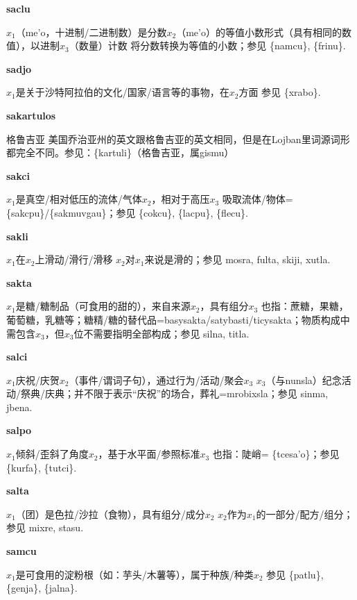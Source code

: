 \documentclass[notitlepage,twocolumn,a4paper,10pt]{book}
\begin{document}
{\sffamily\bfseries saclu} $x_1$（me'o，十进制\slash{}二进制数）是分数$x_2$（me'o）的等值小数形式（具有相同的数值），以进制$x_3$（数量）计数 \textemdash{} 将分数转换为等值的小数；参见 \{namcu\}, \{frinu\}.

{\sffamily\bfseries sadjo}\enspace {\ttfamily\bfseries[    djo]}  $x_1$是关于沙特阿拉伯的文化\slash{}国家\slash{}语言等的事物，在$x_2$方面 \textemdash{} 参见 \{xrabo\}.

{\sffamily\bfseries sakartulos} 格鲁吉亚 \textemdash{} 美国乔治亚州的英文跟格鲁吉亚的英文相同，但是在Lojban里词源词形都完全不同。参见：\{kartuli\}（格鲁吉亚，属gismu）

{\sffamily\bfseries sakci}\enspace {\ttfamily\bfseries[sak]}  $x_1$是真空\slash{}相对低压的流体\slash{}气体$x_2$，相对于高压$x_3$ \textemdash{} 吸取流体\slash{}物体= \{sakcpu\}\slash{}\{sakmuvgau\}；参见 \{cokcu\}, \{lacpu\}, \{flecu\}.

{\sffamily\bfseries sakli}\enspace {\ttfamily\bfseries[sal]}  $x_1$在$x_2$上滑动\slash{}滑行\slash{}滑移 \textemdash{} $x_2$对$x_1$来说是滑的；参见 {mosra}, {fulta}, {skiji}, {xutla}.

{\sffamily\bfseries sakta}\enspace {\ttfamily\bfseries[sat]}  $x_1$是糖\slash{}糖制品（可食用的甜的），来自来源$x_2$，具有组分$x_3$ \textemdash{} 也指：蔗糖，果糖，葡萄糖，乳糖等；糖精\slash{}糖的替代品={basysakta}\slash{}{satybasti}\slash{}{ticysakta}；物质构成中需包含$x_3$，但$x_3$位不需要指明全部构成；参见 {silna}, {titla}.

{\sffamily\bfseries salci}\enspace {\ttfamily\bfseries[    sla]}  $x_1$庆祝\slash{}庆贺$x_2$（事件\slash{}谓词子句），通过行为\slash{}活动\slash{}聚会$x_3$ \textemdash{} $x_3$（与nunsla）纪念活动\slash{}祭典\slash{}庆典；并不限于表示“庆祝”的场合，葬礼={mrobixsla}；参见 {sinma}, {jbena}.

{\sffamily\bfseries salpo}\enspace {\ttfamily\bfseries[        sa'o]}  $x_1$倾斜\slash{}歪斜了角度$x_2$，基于水平面\slash{}参照标准$x_3$ \textemdash{} 也指：陡峭= \{tcesa'o\}；参见 \{kurfa\}, \{tutci\}.

{\sffamily\bfseries salta} $x_1$（团）是色拉\slash{}沙拉（食物），具有组分\slash{}成分$x_2$ \textemdash{} $x_2$作为$x_1$的一部分\slash{}配方\slash{}组分；参见 {mixre}, {stasu}.

{\sffamily\bfseries samcu} $x_1$是可食用的淀粉根（如：芋头\slash{}木薯等），属于种族\slash{}种类$x_2$ \textemdash{} 参见 \{patlu\}, \{genja\}, \{jalna\}.
\end{document}
